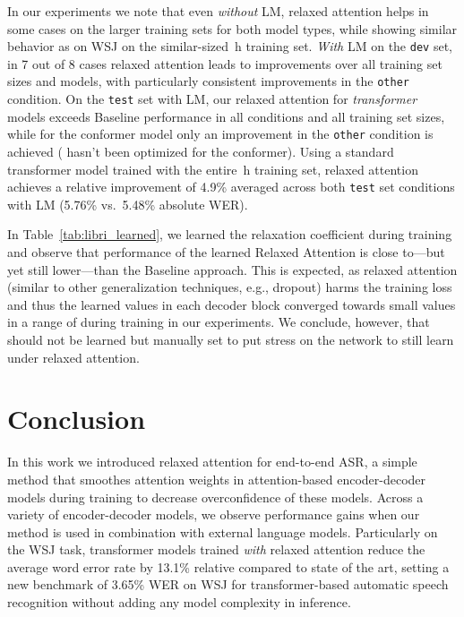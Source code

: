 \documentclass{article}
\begin{document}
In our experiments we note that even \textit{without} LM, relaxed attention helps in some cases on the larger training sets for both model types, while showing similar behavior as on WSJ on the similar-sized \,h training set. \textit{With} LM on the \texttt{dev} set, in 7 out of 8 cases relaxed attention leads to improvements over all training set sizes and models, with particularly consistent improvements in the \texttt{other} condition. On the \texttt{test} set with LM, our relaxed attention for \textit{transformer} models exceeds \textsf{Baseline} performance in all conditions and all training set sizes, while for the conformer model only an improvement in the \texttt{other} condition is achieved ( hasn't been optimized for the conformer). Using a standard transformer model trained with the entire \,h training set, relaxed attention achieves a relative improvement of 4.9\% averaged across both \texttt{test} set conditions with LM (5.76\% vs.\ 5.48\% absolute WER).

In Table~\ref{tab:libri_learned}, we learned the relaxation coefficient  during training and observe that performance of the learned \textsf{Relaxed Attention} is close to---but yet still lower---than the \textsf{Baseline} approach. This is expected, as relaxed attention (similar to other generalization techniques, e.g., dropout) harms the training loss and thus the learned  values in each decoder block converged towards small values in a range of  during training in our experiments. We conclude, however, that  should not be learned but manually set to put stress on the network to still learn under relaxed attention. 
\vspace{-2mm}
\section{Conclusion}\vspace{-3mm}
In this work we introduced relaxed attention for end-to-end ASR, a simple method that smoothes attention weights in attention-based encoder-decoder models during training to decrease overconfidence of these models. Across a variety of encoder-decoder models, we observe performance gains when our method is used in combination with external language models. Particularly on the WSJ task, transformer models trained \textit{with} relaxed attention reduce the average word error rate by 13.1\% relative compared to state of the art, setting a new benchmark of 3.65\% WER on WSJ for transformer-based automatic speech recognition without adding any model complexity in inference.   
\end{document}
